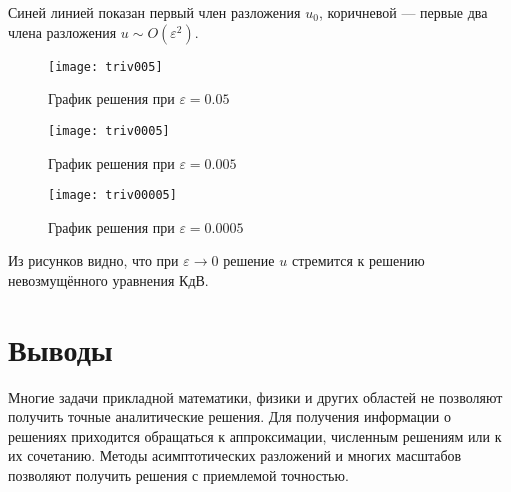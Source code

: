Синей линией показан первый член разложения $u_0$,
коричневой --- первые два члена разложения $u \sim O(\varepsilon^2)$.

\begin{figure}[H]
    \centering
    \texttt{[image: triv005]}
    \caption{График решения при $\varepsilon = 0.05$}
\end{figure}
\begin{figure}[H]
    \centering
    \texttt{[image: triv0005]}
    \caption{График решения при $\varepsilon = 0.005$}
\end{figure}
\begin{figure}[H]
    \centering
    \texttt{[image: triv00005]}
    \caption{График решения при $\varepsilon = 0.0005$}
\end{figure}

Из рисунков видно, что при $\varepsilon \to 0$
решение $u$ стремится к решению невозмущённого уравнения КдВ.

\section*{Выводы}

Многие задачи прикладной математики, физики
и других областей не позволяют получить точные аналитические решения.
Для получения информации о решениях приходится обращаться к аппроксимации,
численным решениям или к их сочетанию.
Методы асимптотических разложений и
многих масштабов позволяют получить решения с приемлемой точностью.
